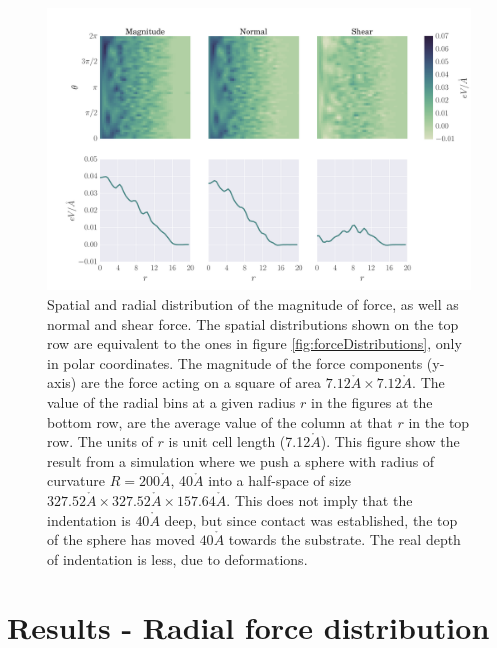 \documentclass[twoside,english]{uiofysmaster}
\begin{document}
\vspace{5mm}
\begin{figure}[H]
	\centering
	\includegraphics[width=\linewidth, trim={12mm 8mm 1mm 15mm}, clip]{figures/forceDistribution/forces/normalForceDistribution110000}
	\vspace{0mm}
	\caption{Spatial and radial distribution of the magnitude of force, as well as normal and shear force. 
		The spatial distributions shown on the top row are equivalent to the ones in figure \ref{fig:forceDistributions}, only in polar coordinates. 
		The magnitude of the force components (y-axis) are the force acting on a square of area $7.12\mathring{A}\times7.12\mathring{A}$.
		The value of the radial bins at a given radius $r$ in the figures at the bottom row, are the average value of the column at that $r$ in the top row.
		The units of $r$ is unit cell length (7.12$\mathring{A}$).
		This figure show the result from a simulation where we push a sphere with radius of curvature $R=200\mathring{A}$,  40$\mathring{A}$ into a half-space of size $327.52\mathring{A} \times 327.52\mathring{A} \times 157.64 \mathring{A}$. 
		This does not imply that the indentation is $40\mathring{A}$ deep, but since contact was established, the top of the sphere has moved $40\mathring{A}$ towards the substrate. The real depth of indentation is less, due to deformations.}
	\label{fig:radialdistribution110000}
\end{figure}



  

\section{Results - Radial force distribution} \label{sec:resultsRadialForceDistribution}
\end{document}
